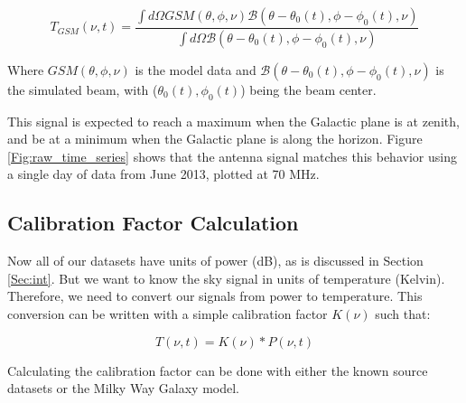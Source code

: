 \begin{equation}
T_{GSM} (\nu,t) = \frac{ \int d \Omega GSM (\theta, \phi, \nu) \mathcal{B} (\theta - \theta_0(t), \phi - \phi_0(t),\nu)}{\int d\Omega \mathcal{B} (\theta -\theta_0(t), \phi - \phi_0(t), \nu)}
\end{equation}

Where $GSM (\theta, \phi, \nu)$ is the model data and $\mathcal{B} (\theta - \theta_0(t), \phi - \phi_0(t),\nu)$ is the simulated beam, with ($\theta_0 (t),\phi_0 (t)$) being the beam center. 

This signal is expected to reach a maximum when the Galactic plane is at zenith, and be at a minimum when the Galactic plane is along the horizon. Figure \ref{Fig:raw_time_series} shows that the antenna signal matches this behavior using a single day of data from June 2013, plotted at 70 MHz. 

\subsection{Calibration Factor Calculation}

Now all of our datasets have units of power (dB), as is discussed in Section \ref{Sec:int}. But we want to know the sky signal in units of temperature (Kelvin). Therefore, we need to convert our signals from power to temperature. This conversion can be written with a simple calibration factor $K(\nu)$ such that:

\begin{equation}
T(\nu,t) = K(\nu)*P(\nu,t)
\end{equation}

Calculating the calibration factor can be done with either the known source datasets or the Milky Way Galaxy model. 

